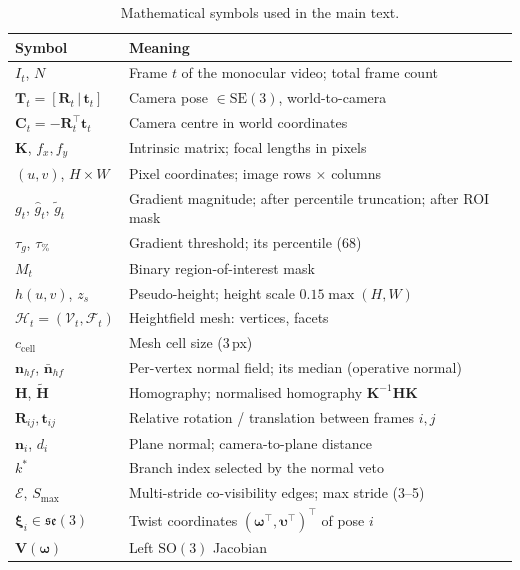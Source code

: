 \documentclass[review]{elsarticle}
\begin{document}
\begin{table}[h]
\centering
\caption{Mathematical symbols used in the main text.}
\label{tab:notation}
\setlength{\tabcolsep}{4pt}
\renewcommand{\arraystretch}{1.12}
\footnotesize
\begin{tabular}{ll}
\toprule
Symbol & Meaning \\
\midrule
$I_t$, $N$ & Frame $t$ of the monocular video; total frame count \\
$\mathbf{T}_t=[\mathbf{R}_t\,|\,\mathbf{t}_t]$ & Camera pose $\in\mathrm{SE}(3)$, world-to-camera \\
$\mathbf{C}_t=-\mathbf{R}_t^\top\mathbf{t}_t$ & Camera centre in world coordinates \\
$\mathbf{K}$, $f_x,f_y$ & Intrinsic matrix; focal lengths in pixels \\
$(u,v)$, $H{\times}W$ & Pixel coordinates; image rows $\times$ columns \\
$g_t$, $\hat g_t$, $\tilde g_t$ & Gradient magnitude; after percentile truncation; after ROI mask \\
$\tau_g$, $\tau_{\%}$ & Gradient threshold; its percentile (68) \\
$M_t$ & Binary region-of-interest mask \\
$h(u,v)$, $z_s$ & Pseudo-height; height scale $0.15\max(H,W)$ \\
$\mathcal{H}_t=(\mathcal{V}_t,\mathcal{F}_t)$ & Heightfield mesh: vertices, facets \\
$c_{\mathrm{cell}}$ & Mesh cell size (3\,px) \\
$\mathbf{n}_{hf}$, $\bar{\mathbf{n}}_{hf}$ & Per-vertex normal field; its median (operative normal) \\
$\mathbf{H}$, $\tilde{\mathbf{H}}$ & Homography; normalised homography $\mathbf{K}^{-1}\mathbf{H}\mathbf{K}$ \\
$\mathbf{R}_{ij},\mathbf{t}_{ij}$ & Relative rotation / translation between frames $i,j$ \\
$\mathbf{n}_i$, $d_i$ & Plane normal; camera-to-plane distance \\
$k^*$ & Branch index selected by the normal veto \\
$\mathcal{E}$, $S_{\max}$ & Multi-stride co-visibility edges; max stride (3--5) \\
$\boldsymbol{\xi}_i\in\mathfrak{se}(3)$ & Twist coordinates $(\boldsymbol{\omega}^\top,\boldsymbol{\upsilon}^\top)^\top$ of pose $i$ \\
$\mathbf{V}(\boldsymbol{\omega})$ & Left $\mathrm{SO}(3)$ Jacobian \\

\end{tabular}
\end{table}
\end{document}
